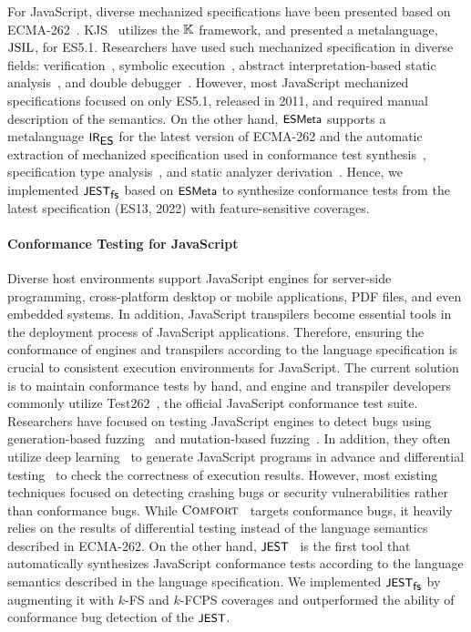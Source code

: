 
For JavaScript, diverse mechanized specifications have
been presented based on ECMA-262~\cite{es13}.
%
KJS~\cite{kjs} utilizes the $\mathbb{K}$ framework, and \citet{javert}
presented a metalanguage, $\text{JSIL}$, for ES5.1.
%
Researchers have used such mechanized specification in diverse fields:
verification~\cite{javert}, symbolic execution~\cite{javert2}, abstract
interpretation-based static analysis~\cite{wala, tajs, jsai, safe, safe2}, and
double debugger~\cite{jsexplain}.
%
However, most JavaScript mechanized specifications focused on only ES5.1,
released in 2011, and required manual description of the semantics.
%
On the other hand, $\textsf{\small ESMeta}$ supports a metalanguage $\textsf{\small IR}_{\textsf{\small ES}}$ for the latest
version of ECMA-262 and the automatic extraction of mechanized specification
used in conformance test synthesis~\cite{jest}, specification type
analysis~\cite{jstar}, and static analyzer derivation~\cite{jsaver}.
%
Hence, we implemented $\textsf{\small JEST}_{\textsf{\small fs}}$ based on $\textsf{\small ESMeta}$ to synthesize conformance tests
from the latest specification (ES13, 2022) with feature-sensitive coverages.


\paragraph{\textbf{Conformance Testing for JavaScript}}
%
Diverse host environments support JavaScript engines for server-side
programming, cross-platform desktop or mobile applications, PDF files, and even
embedded systems.
%
In addition, JavaScript transpilers become essential tools in the deployment
process of JavaScript applications.
%
Therefore, ensuring the conformance of engines and transpilers according to the
language specification is crucial to consistent execution environments for
JavaScript.
%
The current solution is to maintain conformance tests by hand, and engine and
transpiler developers commonly utilize Test262~\cite{test262}, the official
JavaScript conformance test suite.
%
Researchers have focused on testing JavaScript engines to detect bugs using
generation-based fuzzing~\cite{die, codealchemist, favocado, sofi} and
mutation-based fuzzing~\cite{die, codealchemist, ifuzzer, superion}.
%
In addition, they often utilize deep learning~\cite{montage, comfort} to
generate JavaScript programs in advance and differential
testing~\cite{jit-picking} to check the correctness of execution results.
%
However, most existing techniques focused on detecting crashing bugs or security
vulnerabilities rather than conformance bugs.
%
While $\textsc{Comfort}$~\cite{comfort} targets conformance bugs, it heavily relies on
the results of differential testing instead of the language semantics described
in ECMA-262.
%
On the other hand, $\textsf{\small JEST}$~\cite{jest} is the first tool that automatically
synthesizes JavaScript conformance tests according to the language semantics
described in the language specification.
%
We implemented $\textsf{\small JEST}_{\textsf{\small fs}}$ by augmenting it with $k$-FS and $k$-FCPS coverages and
outperformed the ability of conformance bug detection of the $\textsf{\small JEST}$.
